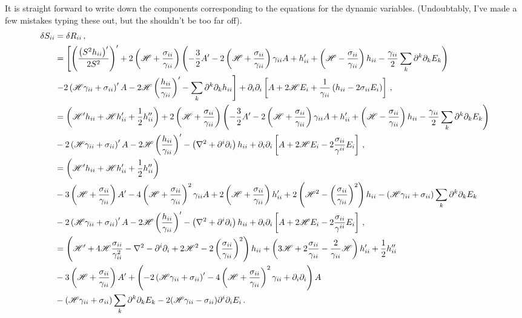\documentclass{article}
\newcommand*\scr[1]{\mathscr{#1}}
\newcommand*\p[1]{\left(#1\right)}
\newcommand*\ps[1]{\left[#1\right]}
\newcommand*\f[2]{\frac{#1}{#2}}
\begin{document}
It is straight forward to write down the components corresponding to the equations for the dynamic variables. (Undoubtably, I've made a few mistakes typing these out, but the shouldn't be too far off).
\begin{align}
\delta S_{ii}&=\delta R_{ii}\,,\\
\notag&=\ps{\p{\f{\p{S^2h_{ii}}'}{2S^2}}'+2\p{\scr H+\f{\sigma_{ii}}{\gamma_{ii}}}\p{-\f32 A'-2\p{\scr H+\f{\sigma_{ii}}{\gamma_{ii}}}\gamma_{ii}A+h_{ii}'+\p{\scr H-\f{\sigma_{ii}}{\gamma_{ii}}}h_{ii}-\f{\gamma_{ii}}2\sum_k\partial^k\partial_k E_k}\right.\\&\left.-2\p{\scr H\gamma_{ii}+\sigma_{ii}}'A-2\scr H\p{\f{h_{ii}}{\gamma_{ii}}}'-\sum_k\partial^k\partial_k h_{ii}}+\partial_i\partial_i\ps{A+2\scr HE_i+\f1{\gamma_{ii}}\p{h_{ii}-2\sigma_{ii}E_i}}\,,\\
\notag&=\p{\scr H'h_{ii}+\scr Hh_{ii}'+\f12h_{ii}''}+2\p{\scr H+\f{\sigma_{ii}}{\gamma_{ii}}}\p{-\f32 A'-2\p{\scr H+\f{\sigma_{ii}}{\gamma_{ii}}}\gamma_{ii}A+h_{ii}'+\p{\scr H-\f{\sigma_{ii}}{\gamma_{ii}}}h_{ii}-\f{\gamma_{ii}}2\sum_k\partial^k\partial_k E_k}\\&-2\p{\scr H\gamma_{ii}+\sigma_{ii}}'A-2\scr H\p{\f{h_{ii}}{\gamma_{ii}}}'-\p{\nabla^2+\partial^i\partial_i} h_{ii}+\partial_i\partial_i\ps{A+2\scr HE_i-2\f{\sigma_{ii}}{\gamma^{ii}}E_i}\,,\\
\notag&=\p{\scr H'h_{ii}+\scr Hh_{ii}'+\f12h_{ii}''}\\\notag&-3\p{\scr H+\f{\sigma_{ii}}{\gamma_{ii}}} A'-4\p{\scr H+\f{\sigma_{ii}}{\gamma_{ii}}}^2\gamma_{ii}A+2\p{\scr H+\f{\sigma_{ii}}{\gamma_{ii}}}h_{ii}'+2\p{\scr H^2-\p{\f{\sigma_{ii}}{\gamma_{ii}}}^2}h_{ii}-\p{\scr H\gamma_{ii}+\sigma_{ii}}\sum_k\partial^k\partial_k E_k\\&-2\p{\scr H\gamma_{ii}+\sigma_{ii}}'A-2\scr H\p{\f{h_{ii}}{\gamma_{ii}}}'-\p{\nabla^2+\partial^i\partial_i} h_{ii}+\partial_i\partial_i\ps{A+2\scr HE_i-2\f{\sigma_{ii}}{\gamma^{ii}}E_i}\,,\\
\notag&=\p{\scr H'+4\scr H\f{\sigma_{ii}}{\gamma_{ii}^2}-\nabla^2-\partial^i\partial_i+2\scr H^2-2\p{\f{\sigma_{ii}}{\gamma_{ii}}}^2}h_{ii}+\p{3\scr H+2\f{\sigma_{ii}}{\gamma_{ii}}-\f{2}{\gamma_{ii}}\scr H}h_{ii}'+\f12h_{ii}''
\\\notag&-3\p{\scr H+\f{\sigma_{ii}}{\gamma_{ii}}} A'+\p{-2\p{\scr H\gamma_{ii}+\sigma_{ii}}'-4\p{\scr H+\f{\sigma_{ii}}{\gamma_{ii}}}^2\gamma_{ii}+\partial_i\partial_i}A\\&-\p{\scr H\gamma_{ii}+\sigma_{ii}}\sum_k\partial^k\partial_k E_k-2(\scr H\gamma_{ii}-\sigma_{ii})\partial^i\partial_iE_i\,.
\end{align}
\end{document}
